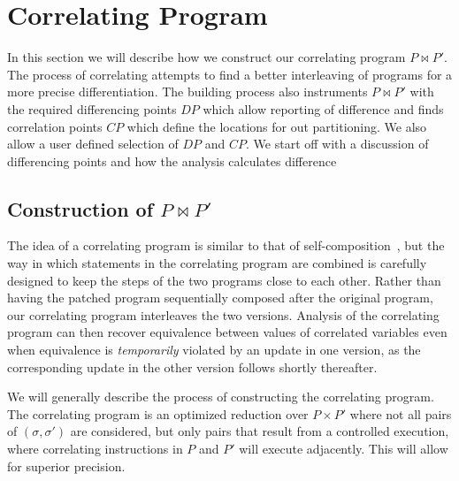 \section{Correlating Program} 

In this section we will describe how we construct our correlating program $P \bowtie P'$. The process of correlating attempts to find a better interleaving of programs for a more precise differentiation. The building process also instruments $P \bowtie P'$ with the required differencing points $DP$ which allow reporting of difference and finds correlation points $CP$ which define the locations for out partitioning. We also allow a user defined selection of $DP$ and $CP$. We start off with a discussion of differencing points and how the analysis calculates difference

\subsection{Construction of $P \bowtie P'$ }
The idea of a correlating program is similar to that of
self-composition~\cite{BartheDArgenioRezk04,AikenTerauchi05}, but the way in
which statements in the correlating program are combined is carefully designed to
keep the steps of the two programs close to each other. Rather than having
the patched program sequentially composed after the original program, our
correlating program interleaves the two versions. Analysis of the correlating program can then recover equivalence between values of correlated variables even when
equivalence is \emph{temporarily} violated by an update in one version, as
the corresponding update in the other version follows shortly thereafter.

We will generally describe the process of constructing the correlating program. The correlating program is an optimized reduction over $P \times P'$ where not all pairs of $(\sigma,\sigma')$ are considered, but only pairs that result from a controlled execution, where correlating instructions in $P$ and $P'$ will execute adjacently. This will allow for superior precision.

